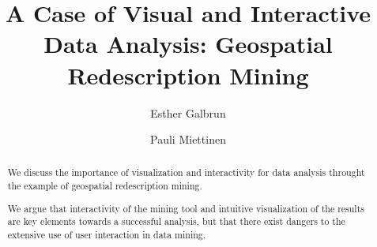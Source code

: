\documentclass{llncs}
\renewcommand{\note}[1]{{\color{red}{#1}\par}}
\begin{document}
\title{A Case of Visual and Interactive Data Analysis: Geospatial Redescription Mining}

\author{
Esther Galbrun
\and
Pauli Miettinen
}

 
\maketitle
\begin{abstract}
  \note{being re-written} 
  We discuss the importance of visualization and
  interactivity for data analysis throught the example of geospatial redescription mining.


  We argue that interactivity of the mining tool and intuitive
  visualization of the results are key elements towards a successful
  analysis, but that there exist dangers to the extensive use of user
  interaction in data mining.
\end{abstract}







%

  
\end{document}
